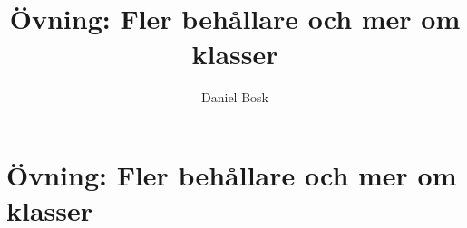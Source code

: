 \documentclass[a4paper,10pt,oneside,openright,
               oldfontcommands]{memoir}
\begin{document}
\title{%
  Övning: Fler behållare och mer om klasser
}
\author{Daniel Bosk}

\maketitle

\begin{abstract}
  
\end{abstract}

\clearpage

\tableofcontents*

\chapter{Övning: Fler behållare och mer om klasser}



\appendix


\printbibliography
\end{document}
